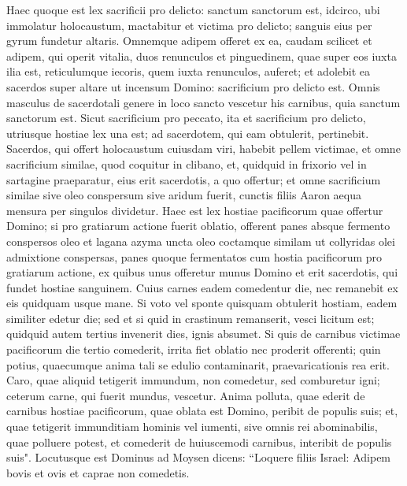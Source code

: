 \begin{biblechapter}  
\verse Haec quoque est lex sacrificii pro delicto: sanctum sanctorum est, 
\verse idcirco, ubi immolatur holocaustum, mactabitur et victima pro delicto; sanguis eius per gyrum fundetur altaris. 
\verse Omnemque adipem offeret ex ea, caudam scilicet et adipem, qui operit vitalia, 
\verse duos renunculos et pinguedinem, quae super eos iuxta ilia est, reticulumque iecoris, quem iuxta renunculos, auferet; 
\verse et adolebit ea sacerdos super altare ut incensum Domino: sacrificium pro delicto est. 
\verse Omnis masculus de sacerdotali genere in loco sancto vescetur his carnibus, quia sanctum sanctorum est. 
\verse Sicut sacrificium pro peccato, ita et sacrificium pro delicto, utriusque hostiae lex una est; ad sacerdotem, qui eam obtulerit, pertinebit. 
\verse Sacerdos, qui offert holocaustum cuiusdam viri, habebit pellem victimae, 
\verse et omne sacrificium similae, quod coquitur in clibano, et, quidquid in frixorio vel in sartagine praeparatur, eius erit sacerdotis, a quo offertur; 
\verse et omne sacrificium similae sive oleo conspersum sive aridum fuerit, cunctis filiis Aaron aequa mensura per singulos dividetur. 
\verse Haec est lex hostiae pacificorum quae offertur Domino; 
\verse si pro gratiarum actione fuerit oblatio, offerent panes absque fermento conspersos oleo et lagana azyma uncta oleo coctamque similam ut collyridas olei admixtione conspersas, 
\verse panes quoque fermentatos cum hostia pacificorum pro gratiarum actione, 
\verse ex quibus unus offeretur munus Domino et erit sacerdotis, qui fundet hostiae sanguinem. 
\verse Cuius carnes eadem comedentur die, nec remanebit ex eis quidquam usque mane. 
\verse Si voto vel sponte quisquam obtulerit hostiam, eadem similiter edetur die; sed et si quid in crastinum remanserit, vesci licitum est; 
\verse quidquid autem tertius invenerit dies, ignis absumet. 
\verse Si quis de carnibus victimae pacificorum die tertio comederit, irrita fiet oblatio nec proderit offerenti; quin potius, quaecumque anima tali se edulio contaminarit, praevaricationis rea erit. 
\verse Caro, quae aliquid tetigerit immundum, non comedetur, sed comburetur igni; ceterum carne, qui fuerit mundus, vescetur. 
\verse Anima polluta, quae ederit de carnibus hostiae pacificorum, quae oblata est Domino, peribit de populis suis; 
\verse et, quae tetigerit immunditiam hominis vel iumenti, sive omnis rei abominabilis, quae polluere potest, et comederit de huiuscemodi carnibus, interibit de populis suis". 
\verse Locutusque est Dominus ad Moysen dicens: 
\verse “Loquere filiis Israel: Adipem bovis et ovis et caprae non comedetis. 

\end{biblechapter}
